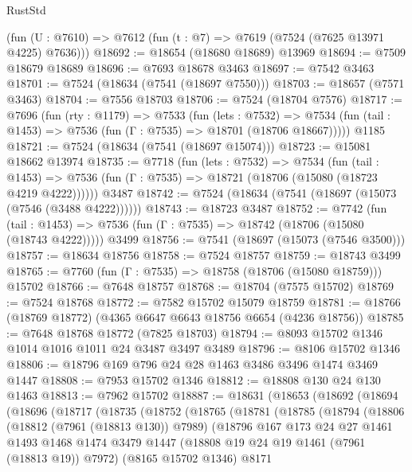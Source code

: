 \begin{lexlean}{RustStd}
\begin{coremodule}
    (fun (U : @7610) => @7612 (fun (t : @7) => @7619 (@7524 (@7625 @13971 @4225) @7636)))
@18692 := @18654 (@18680 @18689) @13969
@18694 := @7509 @18679 @18689
@18696 := @7693 @18678 @3463
@18697 := @7542 @3463
@18701 := @7524 (@18634 (@7541 (@18697 @7550)))
@18703 := @18657 (@7571 @3463)
@18704 := @7556 @18703
@18706 := @7524 (@18704 @7576)
@18717 := @7696
    (fun (rty : @1179) =>
    @7533
      (fun (lets : @7532) =>
      @7534 (fun (tail : @1453) => @7536 (fun (Γ : @7535) => @18701 (@18706 @18667)))))
    @1185
@18721 := @7524 (@18634 (@7541 (@18697 @15074)))
@18723 := @15081 @18662 @13974
@18735 := @7718
    (fun (lets : @7532) =>
    @7534
      (fun (tail : @1453) =>
      @7536 (fun (Γ : @7535) => @18721 (@18706 (@15080 (@18723 @4219 @4222))))))
    @3487
@18742 := @7524 (@18634 (@7541 (@18697 (@15073 (@7546 (@3488 @4222))))))
@18743 := @18723 @3487
@18752 := @7742
    (fun (tail : @1453) => @7536 (fun (Γ : @7535) => @18742 (@18706 (@15080 (@18743 @4222)))))
    @3499
@18756 := @7541 (@18697 (@15073 (@7546 @3500)))
@18757 := @18634 @18756
@18758 := @7524 @18757
@18759 := @18743 @3499
@18765 := @7760 (fun (Γ : @7535) => @18758 (@18706 (@15080 @18759))) @15702
@18766 := @7648 @18757
@18768 := @18704 (@7575 @15702)
@18769 := @7524 @18768
@18772 := @7582 @15702 @15079 @18759
@18781 := @18766 (@18769 @18772) (@4365 @6647 @6643 @18756 @6654 (@4236 @18756))
@18785 := @7648 @18768 @18772 (@7825 @18703)
@18794 := @8093 @15702 @1346 @1014 @1016 @1011 @24 @3487 @3497 @3489
@18796 := @8106 @15702 @1346
@18806 := @18796 @169 @796 @24 @28 @1463 @3486 @3496 @1474 @3469 @1447
@18808 := @7953 @15702 @1346
@18812 := @18808 @130 @24 @130 @1463
@18813 := @7962 @15702
@18887 := @18631
    (@18653
      (@18692
        (@18694
          (@18696
            (@18717
              (@18735
                (@18752
                  (@18765
                    (@18781
                      (@18785
                        (@18794
                          (@18806
                            (@18812 (@7961 (@18813 @130)) @7989)
                            (@18796
                              @167
                              @173
                              @24
                              @27
                              @1461
                              @1493
                              @1468
                              @1474
                              @3479
                              @1447
                              (@18808 @19 @24 @19 @1461 (@7961 (@18813 @19)) @7972)
                              (@8165 @15702 @1346)
                              @8171

\end{coremodule}
\end{lexlean}
